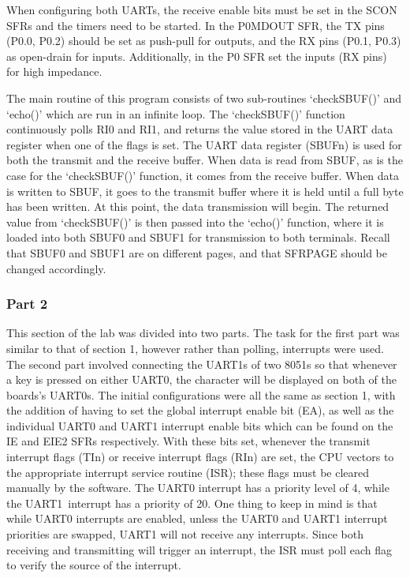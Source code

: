 \documentclass[12pt]{article}
\newcommand{\uo}{UART1}
\begin{document}
When configuring both UARTs, the receive enable bits must be set in the SCON SFRs and the timers need to be started. In the P0MDOUT SFR, the TX pins (P0.0, P0.2) should be set as push-pull for outputs, and the RX pins (P0.1, P0.3) as open-drain for inputs. Additionally, in the P0 SFR set the inputs (RX pins) for high impedance. 

The main routine of this program consists of two sub-routines `checkSBUF()' and `echo()' which are run in an infinite loop. The `checkSBUF()' function continuously polls RI0 and RI1, and returns the value stored in the UART data register when one of the flags is set. The UART data register (SBUFn) is used for both the transmit and the receive buffer. When data is read from SBUF, as is the case for the `checkSBUF()' function, it comes from the receive buffer. When data is written to SBUF, it goes to the transmit buffer where it is held until a full byte has been written. At this point, the data transmission will begin. The returned value from `checkSBUF()' is then passed into the `echo()' function, where it is loaded into both SBUF0 and SBUF1 for transmission to both terminals. Recall that SBUF0 and SBUF1 are on different pages, and that SFRPAGE should be changed accordingly. 

\subsubsection{Part 2}
This section of the lab was divided into two parts.
The task for the first part was similar to that of section 1, however rather than polling, interrupts were used. The second part involved connecting the UART1s of two 8051s so that whenever a key is pressed on either UART0, the character will be displayed on both of the boards\textquoteright s UART0s. The initial configurations were all the same as section 1, with the addition of having to set the global interrupt enable bit (EA), as well as the individual UART0 and UART1 interrupt enable bits which can be found on the IE and EIE2 SFRs respectively. With these bits set, whenever the transmit interrupt flags (TIn) or receive interrupt flags (RIn) are set, the CPU vectors to the appropriate interrupt service routine (ISR); these flags must be cleared manually by the software. The UART0 interrupt has a priority level of 4, while the \uo\ interrupt has a priority of 20. One thing to keep in mind is that while UART0 interrupts are enabled, unless the UART0 and UART1 interrupt priorities are swapped, UART1 will not receive any interrupts. Since both receiving and transmitting will trigger an interrupt, the ISR must poll each flag to verify the source of the interrupt. 
\end{document}
